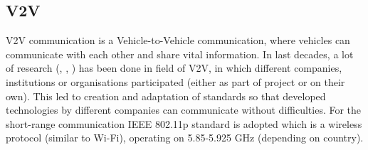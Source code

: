 \subsection{V2V}

\acrshort{V2V} communication is a Vehicle-to-Vehicle communication, where vehicles can communicate with each other and share vital information. In last decades, a lot of research (\cite{Chan2012ProjectSARTRE}, \cite{Safespot}, \cite{2016CompanionProject}) has been done in field of \acrshort{V2V}, in which different companies, institutions or organisations participated (either as part of project or on their own). This led to creation and adaptation of standards so that developed technologies by different companies can communicate without difficulties. For the short-range communication \acrshort{IEEE} 802.11p standard is adopted which is a wireless protocol (similar to Wi-Fi), operating on 5.85-5.925 GHz (depending on country).









